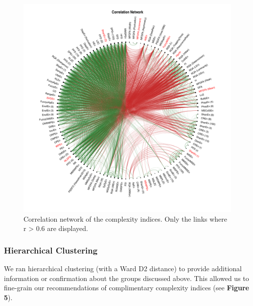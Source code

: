 \documentclass[
  man]{apa6}
\begin{document}
\begin{figure}
\centering
\includegraphics{manuscript_files/figure-latex/ggm-1.pdf}
\caption{\label{fig:ggm}Correlation network of the complexity indices. Only the links where \textbar r\textbar{} \textgreater{} 0.6 are displayed.}
\end{figure}

\hypertarget{hierarchical-clustering}{%
\subsubsection{Hierarchical Clustering}\label{hierarchical-clustering}}

We ran hierarchical clustering (with a Ward D2 distance) to provide additional information or confirmation about the groups discussed above. This allowed us to fine-grain our recommendations of complimentary complexity indices (see \textbf{Figure 5}).
\end{document}
